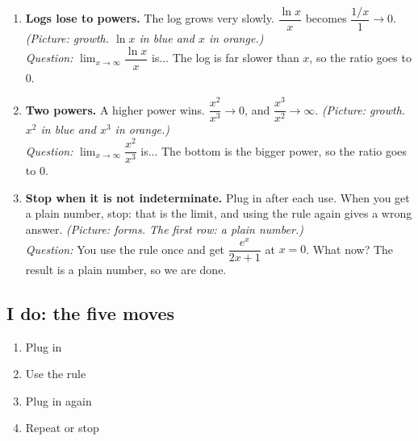 \documentclass[11pt]{article}
\begin{document}
\begin{enumerate}
\item \textbf{Logs lose to powers.} The log grows very slowly. $\dfrac{\ln x}{x}$ becomes $\dfrac{1/x}{1}\to0$. \textit{(Picture: growth. $\ln x$ in blue and $x$ in orange.)}\\ \textit{Question:} $\displaystyle\lim_{x\to\infty}\dfrac{\ln x}{x}$ is...  The log is far slower than $x$, so the ratio goes to 0.
\item \textbf{Two powers.} A higher power wins. $\dfrac{x^2}{x^3}\to0$, and $\dfrac{x^3}{x^2}\to\infty$. \textit{(Picture: growth. $x^2$ in blue and $x^3$ in orange.)}\\ \textit{Question:} $\displaystyle\lim_{x\to\infty}\dfrac{x^2}{x^3}$ is...  The bottom is the bigger power, so the ratio goes to 0.
\item \textbf{Stop when it is not indeterminate.} Plug in after each use. When you get a plain number, stop: that is the limit, and using the rule again gives a wrong answer. \textit{(Picture: forms. The first row: a plain number.)}\\ \textit{Question:} You use the rule once and get $\dfrac{e^x}{2x+1}$ at $x=0$. What now?  The result is a plain number, so we are done.
\end{enumerate}
\subsection*{I do: the five moves}\begin{enumerate}\item Plug in
\item Use the rule
\item Plug in again
\item Repeat or stop\end{enumerate}
\end{document}
